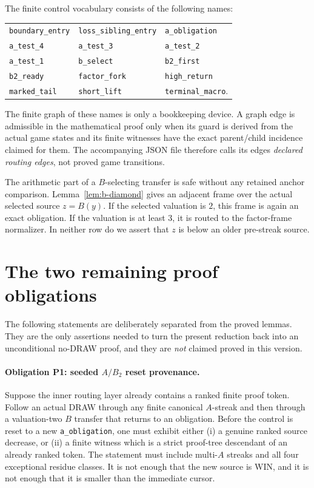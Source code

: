 \documentclass[11pt]{article}
\begin{document}
The finite control vocabulary consists of the following names:
\begin{center}
\begin{tabular}{lll}
\texttt{boundary\_entry} & \texttt{loss\_sibling\_entry} & \texttt{a\_obligation}\\
\texttt{a\_test\_4} & \texttt{a\_test\_3} & \texttt{a\_test\_2}\\
\texttt{a\_test\_1} & \texttt{b\_select} & \texttt{b2\_first}\\
\texttt{b2\_ready} & \texttt{factor\_fork} & \texttt{high\_return}\\
\texttt{marked\_tail} & \texttt{short\_lift} & \texttt{terminal\_macro}.
\end{tabular}
\end{center}
The finite graph of these names is only a bookkeeping device.  A graph edge is
admissible in the mathematical proof only when its guard is derived from the
actual game states and its finite witnesses have the exact parent/child
incidence claimed for them.  The accompanying JSON file therefore calls its
edges \emph{declared routing edges}, not proved game transitions.

The arithmetic part of a $B$-selecting transfer is safe without any retained
anchor comparison.  Lemma~\ref{lem:b-diamond} gives an adjacent frame over the
actual selected source $z=B(y)$.  If the selected valuation is $2$, this frame
is again an exact obligation.  If the valuation is at least $3$, it is routed
to the factor-frame normalizer.  In neither row do we assert that $z$ is below
an older pre-streak source.

\section{The two remaining proof obligations}\label{sec:remaining}

The following statements are deliberately separated from the proved lemmas.
They are the only assertions needed to turn the present reduction back into an
unconditional no-DRAW proof, and they are \emph{not} claimed proved in this
version.

\paragraph{Obligation P1: seeded $A/B_2$ reset provenance.}
Suppose the inner routing layer already contains a ranked finite proof token.
Follow an actual DRAW through any finite canonical $A$-streak and then through
a valuation-two $B$ transfer that returns to an obligation.  Before the
control is reset to a new \texttt{a\_obligation}, one must exhibit either
(i) a genuine ranked source decrease, or (ii) a finite witness which is a
strict proof-tree descendant of an already ranked token.  The statement must
include multi-$A$ streaks and all four exceptional residue classes.  It is not
enough that the new source is WIN, and it is not enough that it is smaller
than the immediate cursor.
\end{document}
